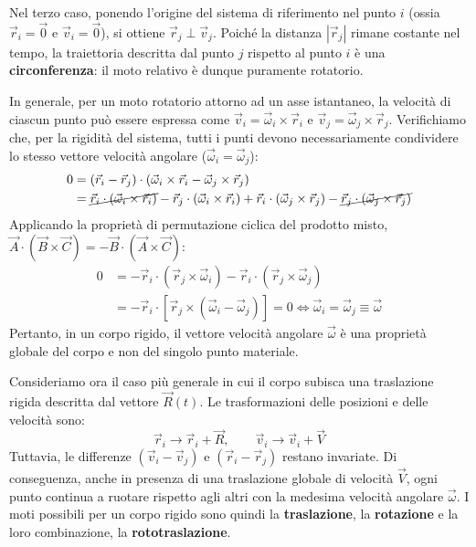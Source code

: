 Nel terzo caso, ponendo l'origine del sistema di riferimento nel punto $i$ (ossia $\vec{r}_i = \vec{0}$ e $\vec{v}_i = \vec{0}$), si ottiene $\vec{r}_j \perp \vec{v}_j$. Poiché la distanza $|\vec{r}_j|$ rimane costante nel tempo, la traiettoria descritta dal punto $j$ rispetto al punto $i$ è una \textbf{circonferenza}: il moto relativo è dunque puramente rotatorio.

In generale, per un moto rotatorio attorno ad un asse istantaneo, la velocità di ciascun punto può essere espressa come $\vec{v}_i = \vec{\omega}_i \times \vec{r}_i$ e $\vec{v}_j = \vec{\omega}_j \times \vec{r}_j$. Verifichiamo che, per la rigidità del sistema, tutti i punti devono necessariamente condividere lo stesso vettore velocità angolare ($\vec{\omega}_i = \vec{\omega}_j$):
\begin{align*}
    0 &= (\vec{r}_i - \vec{r}_j) \cdot (\vec{\omega}_i \times \vec{r}_i - \vec{\omega}_j \times \vec{r}_j) \\
    &= \cancel{\vec{r}_i \cdot (\vec{\omega}_i \times \vec{r}_i)} - \vec{r}_j \cdot (\vec{\omega}_i \times \vec{r}_i) + \vec{r}_i \cdot (\vec{\omega}_j \times \vec{r}_j) - \cancel{\vec{r}_j \cdot (\vec{\omega}_j \times \vec{r}_j)}
\end{align*}
Applicando la proprietà di permutazione ciclica del prodotto misto, $\vec{A} \cdot (\vec{B} \times \vec{C}) = -\vec{B} \cdot (\vec{A} \times \vec{C})$:
\begin{align*}
    0 &= - \vec{r}_i \cdot (\vec{r}_j \times \vec{\omega}_i) - \vec{r}_i \cdot (\vec{r}_j \times \vec{\omega}_j) \\
    &= - \vec{r}_i \cdot \left[ \vec{r}_j \times (\vec{\omega}_i - \vec{\omega}_j) \right] = 0 \iff \vec{\omega}_i = \vec{\omega}_j \equiv \vec{\omega}
\end{align*}
Pertanto, in un corpo rigido, il vettore velocità angolare $\vec{\omega}$ è una proprietà globale del corpo e non del singolo punto materiale.

Consideriamo ora il caso più generale in cui il corpo subisca una traslazione rigida descritta dal vettore $\vec{R}(t)$. Le trasformazioni delle posizioni e delle velocità sono:
\begin{equation*}
    \vec{r}_i \to \vec{r}_i + \vec{R}, \qquad \vec{v}_i \to \vec{v}_i + \vec{V}
\end{equation*}
Tuttavia, le differenze $(\vec{v}_i - \vec{v}_j)$ e $(\vec{r}_i - \vec{r}_j)$ restano invariate. Di conseguenza, anche in presenza di una traslazione globale di velocità $\vec{V}$, ogni punto continua a ruotare rispetto agli altri con la medesima velocità angolare $\vec{\omega}$.
I moti possibili per un corpo rigido sono quindi la \textbf{traslazione}, la \textbf{rotazione} e la loro combinazione, la \textbf{rototraslazione}.


